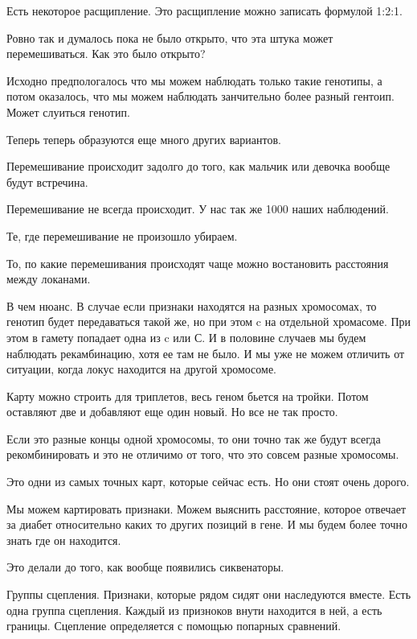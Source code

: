 Есть некоторое 
расщипление. Это расщипление можно записать формулой 1:2:1.

Ровно так и думалось пока не было открыто, что 
эта штука может перемешиваться. Как 
это было открыто? 

Исходно предпологалось что мы можем наблюдать только такие генотипы, а
потом оказалось, что мы можем наблюдать занчительно 
более разный гентоип. Может слуиться генотип. 

Теперь теперь образуются еще много других вариантов. 

Перемешивание происходит задолго до того, 
как мальчик или девочка вообще будут встречина. 

Перемешивание не всегда происходит. У нас 
так же 1000 наших наблюдений.

Те, где перемешивание не произошло убираем. 

То, по какие перемешивания происходят чаще 
можно востановить расстояния между локанами. 


В чем нюанс. В случае если признаки находятся на
разных хромосомах, то генотип будет передаваться такой же,
но при этом c на отдельной хромасоме. При этом в гамету
попадает одна из c или С. И в половине
случаев мы будем наблюдать рекамбинацию,
хотя ее там не было. И мы уже не можем
отличить от ситуации, когда локус находится на другой хромосоме.

Карту можно строить для триплетов, весь геном
бьется на тройки. Потом оставляют две и добавляют еще
один новый. Но все не так просто.

Если это разные концы одной хромосомы, то они точно так же
будут всегда рекомбинировать и это не отличимо от
того, что это совсем разные хромосомы.

Это одни из самых точных карт, которые сейчас есть. Но
они стоят очень дорого.

Мы можем картировать признаки. Можем выяснить расстояние, которое
отвечает за диабет относительно каких то других позиций в гене.
И мы будем более точно знать где он находится.

Это делали до того, как вообще появились сиквенаторы.

 
Группы сцепления. Признаки, которые рядом сидят 
они наследуются вместе. Есть одна группа сцепления. 
Каждый из призноков внути находится в ней, а есть 
границы. Сцепление определяется с помощью попарных сравнений. 


